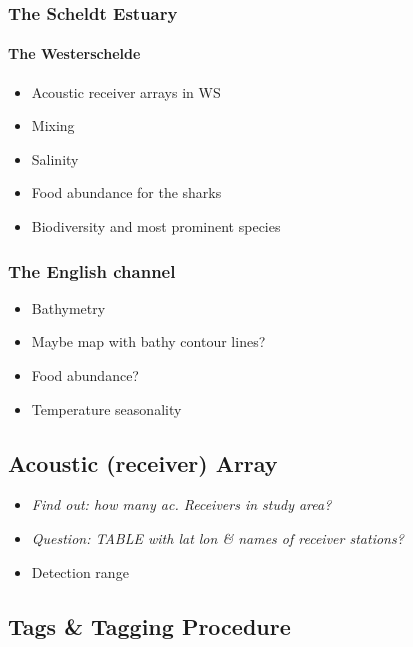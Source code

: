 \documentclass[
  authoryear,
  review,
  3p]{elsarticle}
\let\oldparagraph\paragraph
\renewcommand{\paragraph}[1]{\oldparagraph{#1}\mbox{}}
\providecommand{\tightlist}{%
  \setlength{\itemsep}{0pt}\setlength{\parskip}{0pt}}\usepackage{longtable,booktabs,array}
\begin{document}
\hypertarget{the-scheldt-estuary}{%
\subsubsection{The Scheldt Estuary}\label{the-scheldt-estuary}}

\hypertarget{the-westerschelde}{%
\paragraph{The Westerschelde}\label{the-westerschelde}}

\begin{itemize}
\tightlist
\item
  Acoustic receiver arrays in WS
\item
  Mixing
\item
  Salinity
\item
  Food abundance for the sharks
\item
  Biodiversity and most prominent species
\end{itemize}

\hypertarget{the-english-channel}{%
\subsubsection{The English channel}\label{the-english-channel}}

\begin{itemize}
\tightlist
\item
  Bathymetry
\item
  Maybe map with bathy contour lines?
\item
  Food abundance?
\item
  Temperature seasonality
\end{itemize}

\hypertarget{acoustic-receiver-array}{%
\subsection{Acoustic (receiver) Array}\label{acoustic-receiver-array}}

\begin{itemize}
\item
  \emph{Find out: how many ac. Receivers in study area?}
\item
  \emph{Question: TABLE with lat lon \& names of receiver stations?}
\item
  Detection range
\end{itemize}

\hypertarget{tags-tagging-procedure}{%
\subsection{Tags \& Tagging Procedure}\label{tags-tagging-procedure}}
\end{document}
